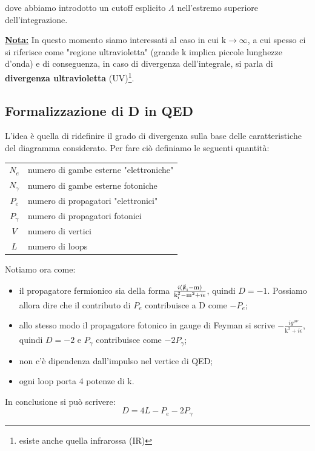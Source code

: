 \documentclass[../main.tex]{subfiles}
\begin{document}
dove abbiamo introdotto un cutoff esplicito $\Lambda$ nell'estremo superiore dell'integrazione. 

\underline{\textbf{Nota:}} In questo momento siamo interessati al caso in cui $\mathrm{k}\rightarrow\infty$, a cui spesso ci si riferisce come "regione ultravioletta" (grande k implica piccole lunghezze d'onda) e di conseguenza, in caso di divergenza dell'integrale, si parla di \textbf{divergenza ultravioletta} (UV)\footnote{esiste anche quella infrarossa (IR)}.

\subsection{Formalizzazione di D in QED}
L'idea è quella di ridefinire il grado di divergenza sulla base delle caratteristiche del diagramma considerato. Per fare ciò definiamo le seguenti quantità:
\begin{center}
    \begin{tabular}{|c||l}
    \hline
      $N_e$        &  numero di gambe esterne "elettroniche"\\
      $N_\gamma$   &  numero di gambe esterne fotoniche\\
      $P_e$        &  numero di propagatori "elettronici"\\
      $P_\gamma$   &  numero di propagatori fotonici\\
      $V$          &  numero di vertici\\
      $L$          &  numero di loops \\
    \hline
    \end{tabular}
\end{center}

Notiamo ora come:
\begin{itemize}
    \item il propagatore fermionico sia della forma $\frac{i\mathrm{(\slashed k_i-m)}}{\mathrm{k_i^2-m^2}+i\epsilon}$, quindi $D=-1$. Possiamo allora dire che il contributo di $P_e$ contribuisce a D come $-P_e$;
    \item allo stesso modo il propagatore fotonico in gauge di Feyman si scrive $-\frac{ig^{\mu\nu}}{\mathrm{k^2}+i\epsilon}$, quindi $D=-2$ e $P_\gamma$ contribuisce come $-2P_\gamma$;
    \item non c'è dipendenza dall'impulso nel vertice di QED;
    \item ogni loop porta 4 potenze di k.
\end{itemize}

In conclusione si può scrivere:
\begin{equation}
    D = 4L - P_e - 2P_\gamma
    \label{eq:D_loop_propagators}
\end{equation}
\end{document}
